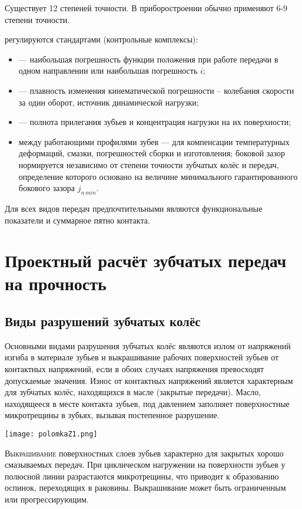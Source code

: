 Существует 12 степеней точности. В приборостроении обычно применяют 6-9 степени точности.

 регулируются стандартами (контрольные комплексы):
\begin{itemize}
	\item {} --- наибольшая погрешность функции положения при работе передачи в одном направлении или наибольшая погрешность $ i $;
	\item {} --- плавность изменения кинематической погрешности – колебания скорости за один оборот, источник динамической нагрузки;
	\item {} --- полнота прилегания зубьев и концентрация нагрузки на их поверхности;
	\item {} между работающими профилями зубев --- для компенсации температурных деформаций, смазки, погрешностей сборки и изготовления; боковой зазор нормируется независимо от степени точности зубчатых колёс и передач, определение которого основано на величине минимального гарантированного бокового зазора $ j_{n\,min} $.
\end{itemize}

Для всех видов передач предпочтительными являются функциональные показатели  и суммарное пятно контакта.

\section{Проектный расчёт зубчатых передач на прочность}
\subsection{Виды разрушений зубчатых колёс}
Основными видами разрушения зубчатых колёс являются излом от напряжений изгиба в материале зубьев и выкрашивание рабочих поверхностей зубьев от контактных напряжений, если в обоих случаях напряжения превосходят допускаемые значения. 
Износ от контактных напряжений является характерным для зубчатых колёс, находящихся в масле (закрытые передачи).
Масло, находящееся в месте контакта зубьев, под давлением заполняет поверхностные микротрещины в зубьях, вызывая постепенное разрушение.

\begin{marginfigure}
	\texttt{[image: polomkaZ1.png]}
\end{marginfigure} 
\textsc{Выкрашивание} поверхностных слоев зубьев характерно для закрытых хорошо смазываемых передач. 
При циклическом нагружении на поверхности зубьев у полюсной линии разрастаются микротрещины, что приводит к образованию оспинок, переходящих в раковины. Выкрашивание может быть ограниченным или прогрессирующим.

